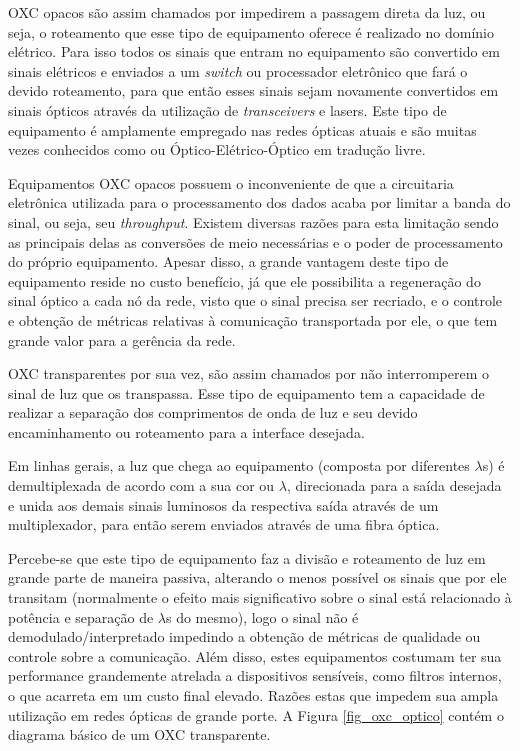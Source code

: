OXC opacos são assim chamados por impedirem a passagem direta da luz, ou seja, o roteamento que esse tipo de equipamento oferece é realizado no domínio elétrico. Para isso todos os sinais que entram no equipamento são convertido em sinais elétricos e enviados a um \emph{switch} ou processador eletrônico que fará o devido roteamento, para que então esses sinais sejam novamente convertidos em sinais ópticos através da utilização de \emph{transceivers} e lasers. Este tipo de equipamento é amplamente empregado nas redes ópticas atuais e são muitas vezes conhecidos como  ou Óptico-Elétrico-Óptico em tradução livre.

Equipamentos OXC opacos possuem o inconveniente de que a circuitaria eletrônica utilizada para o processamento dos dados acaba por limitar a banda do sinal, ou seja, seu \emph{throughput}. Existem diversas razões para esta limitação sendo as principais delas as conversões de meio necessárias e o poder de processamento do próprio equipamento. Apesar disso, a grande vantagem deste tipo de equipamento reside no custo benefício, já que ele possibilita a regeneração do sinal óptico a cada nó da rede, visto que o sinal precisa ser recriado, e o controle e obtenção de métricas relativas à comunicação transportada por ele, o que tem grande valor para a gerência da rede.  

OXC transparentes por sua vez, são assim chamados por não interromperem o sinal de luz que os transpassa. Esse tipo de equipamento tem a capacidade de realizar a separação dos comprimentos de onda de luz e seu devido encaminhamento ou roteamento para a interface desejada. 

Em linhas gerais, a luz que chega ao equipamento (composta por diferentes $\lambda$s) é demultiplexada de acordo com a sua cor ou $\lambda$, direcionada para a saída desejada e unida aos demais sinais luminosos da respectiva saída através de um multiplexador, para então serem enviados através de uma fibra óptica. 

Percebe-se que este tipo de equipamento faz a divisão e roteamento de luz em grande parte de maneira passiva, alterando o menos possível os sinais que por ele transitam (normalmente o efeito mais significativo sobre o sinal está relacionado à potência e separação de $\lambda$s do mesmo), logo o sinal não é demodulado/interpretado impedindo a obtenção de métricas de qualidade ou controle sobre a comunicação. Além disso, estes equipamentos costumam ter sua performance grandemente atrelada a dispositivos sensíveis, como filtros internos, o que acarreta em um custo final elevado. Razões estas que impedem sua ampla utilização em redes ópticas de grande porte. A Figura \ref{fig_oxc_optico} contém o diagrama básico de um OXC transparente. 

